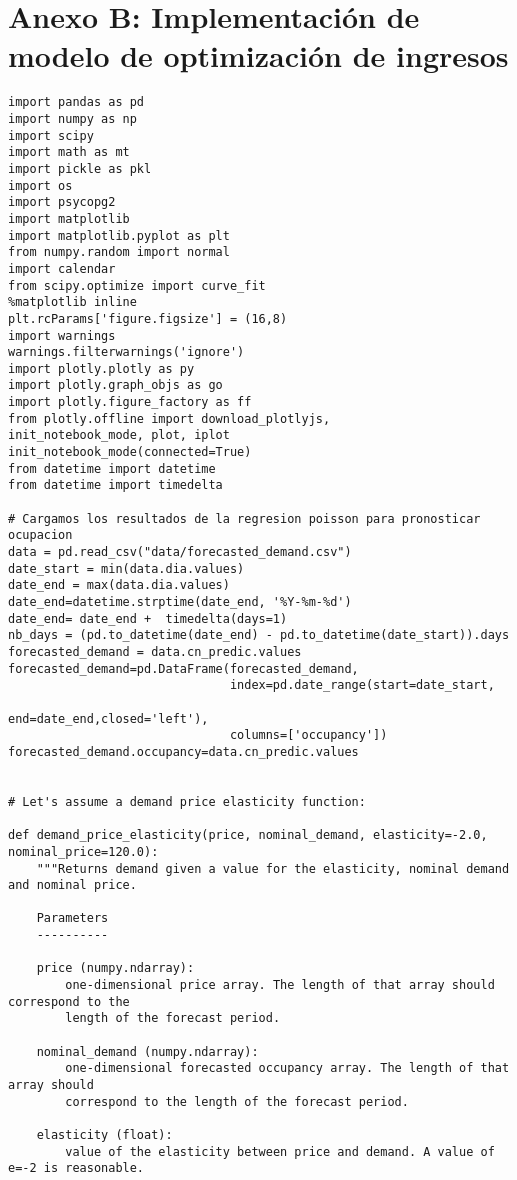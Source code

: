 \chapter{Anexo B: Implementación de modelo de optimización de ingresos}
\label{ch:anexob}

\begin{verbatim}
import pandas as pd
import numpy as np
import scipy
import math as mt
import pickle as pkl
import os
import psycopg2
import matplotlib
import matplotlib.pyplot as plt
from numpy.random import normal
import calendar
from scipy.optimize import curve_fit
%matplotlib inline
plt.rcParams['figure.figsize'] = (16,8)
import warnings
warnings.filterwarnings('ignore')
import plotly.plotly as py
import plotly.graph_objs as go
import plotly.figure_factory as ff
from plotly.offline import download_plotlyjs, 
init_notebook_mode, plot, iplot
init_notebook_mode(connected=True)
from datetime import datetime
from datetime import timedelta

# Cargamos los resultados de la regresion poisson para pronosticar ocupacion
data = pd.read_csv("data/forecasted_demand.csv")
date_start = min(data.dia.values)
date_end = max(data.dia.values)
date_end=datetime.strptime(date_end, '%Y-%m-%d')
date_end= date_end +  timedelta(days=1)
nb_days = (pd.to_datetime(date_end) - pd.to_datetime(date_start)).days
forecasted_demand = data.cn_predic.values
forecasted_demand=pd.DataFrame(forecasted_demand,
                               index=pd.date_range(start=date_start,
                                                   end=date_end,closed='left'),
                               columns=['occupancy'])
forecasted_demand.occupancy=data.cn_predic.values


# Let's assume a demand price elasticity function:

def demand_price_elasticity(price, nominal_demand, elasticity=-2.0, nominal_price=120.0):
    """Returns demand given a value for the elasticity, nominal demand and nominal price.

    Parameters
    ----------

    price (numpy.ndarray):
        one-dimensional price array. The length of that array should correspond to the
        length of the forecast period.

    nominal_demand (numpy.ndarray):
        one-dimensional forecasted occupancy array. The length of that array should
        correspond to the length of the forecast period.

    elasticity (float):
        value of the elasticity between price and demand. A value of e=-2 is reasonable.


\end{verbatim}
